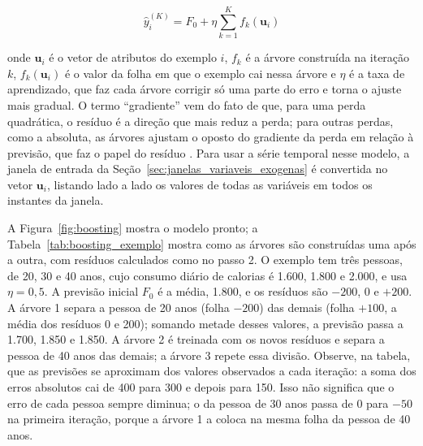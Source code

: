 \begin{equation}
    \hat{y}_i^{(K)} = F_0 + \eta\sum_{k=1}^{K} f_k(\mathbf{u}_i)
    \label{eq:xgboost_aditivo}
\end{equation}

\noindent onde \(\mathbf{u}_i\) é o vetor de atributos do exemplo \(i\), \(f_k\) é a árvore construída na iteração \(k\), \(f_k(\mathbf{u}_i)\) é o valor da folha em que o exemplo cai nessa árvore e \(\eta\) é a taxa de aprendizado, que faz cada árvore corrigir só uma parte do erro e torna o ajuste mais gradual. O termo ``gradiente'' vem do fato de que, para uma perda quadrática, o resíduo é a direção que mais reduz a perda; para outras perdas, como a absoluta, as árvores ajustam o oposto do gradiente da perda em relação à previsão, que faz o papel do resíduo \cite{friedman2001greedy}. Para usar a série temporal nesse modelo, a janela de entrada da Seção~\ref{sec:janelas_variaveis_exogenas} é convertida no vetor \(\mathbf{u}_i\), listando lado a lado os valores de todas as variáveis em todos os instantes da janela.

A Figura~\ref{fig:boosting} mostra o modelo pronto; a Tabela~\ref{tab:boosting_exemplo} mostra como as árvores são construídas uma após a outra, com resíduos calculados como no passo 2. O exemplo tem três pessoas, de 20, 30 e 40 anos, cujo consumo diário de calorias é 1.600, 1.800 e 2.000, e usa \(\eta=0{,}5\). A previsão inicial \(F_0\) é a média, 1.800, e os resíduos são \(-200\), 0 e \(+200\). A árvore 1 separa a pessoa de 20 anos (folha \(-200\)) das demais (folha \(+100\), a média dos resíduos 0 e 200); somando metade desses valores, a previsão passa a 1.700, 1.850 e 1.850. A árvore 2 é treinada com os novos resíduos e separa a pessoa de 40 anos das demais; a árvore 3 repete essa divisão. Observe, na tabela, que as previsões se aproximam dos valores observados a cada iteração: a soma dos erros absolutos cai de 400 para 300 e depois para 150. Isso não significa que o erro de cada pessoa sempre diminua; o da pessoa de 30 anos passa de 0 para \(-50\) na primeira iteração, porque a árvore 1 a coloca na mesma folha da pessoa de 40 anos.

